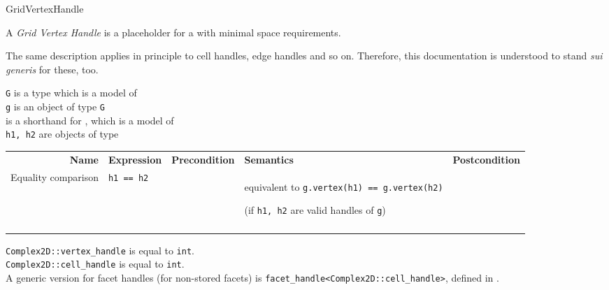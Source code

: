 \begin{Label}{GridVertexHandle}
\end{Label}


A {\em Grid Vertex Handle\/} is a placeholder for a 
with minimal space requirements.

The same description applies in principle to cell handles, edge handles and so on.
Therefore, this documentation is understood to stand {\em sui generis\/} for these, too.


\W{}
{\tt G} is a type which is a model of 
\\
{\tt g} is an object of type  {\tt G}
\\
 is a shorthand for , which is a model 
of 
\\
{\tt h1, h2} are objects of type 

\W{}

\W{}

\begin{tabularx}{15cm}{Rllp{5cm}R} 
  \T \\ \hline 
  \bf  Name     &
  \bf  Expression &
  \bf  Precondition&
  \bf  Semantics &
  \bf  Postcondition
  \\ 
  \hline
  Equality comparison & 
  {\tt h1 == h2} &
  ~ &
  equivalent to  {\tt g.vertex(h1) == g.vertex(h2)}
  \par (if  {\tt h1, h2}
  are valid handles of {\tt g}) &
  ~  
  \T \\  \hline \\
\end{tabularx}


{\tt Complex2D::vertex\_handle} is equal to {\tt int}.
\\
{\tt Complex2D::cell\_handle} is equal to {\tt int}.
\\
A generic version for facet handles 
(for non-stored facets)
is {\tt facet\_handle<Complex2D::cell\_handle>},
defined in .

 ~
 ~
 ~
 ~
 ~

  

